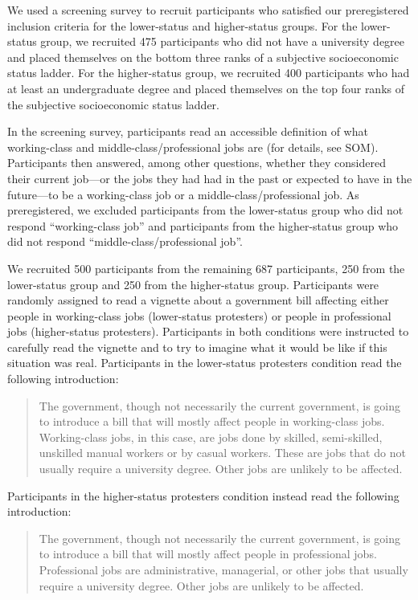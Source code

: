 \documentclass[12pt, letterpaper]{article}
\begin{document}
We used a screening survey to recruit participants who satisfied our
preregistered inclusion criteria for the lower-status and higher-status
groups. For the lower-status group, we recruited 475 participants who
did not have a university degree and placed themselves on the bottom
three ranks of a subjective socioeconomic status ladder. For the
higher-status group, we recruited 400 participants who had at least an
undergraduate degree and placed themselves on the top four ranks of the
subjective socioeconomic status ladder.

In the screening survey, participants read an accessible definition of
what working-class and middle-class/professional jobs are (for details,
see SOM). Participants then answered, among other questions, whether
they considered their current job---or the jobs they had had in the past
or expected to have in the future---to be a working-class job or a
middle-class/professional job. As preregistered, we excluded
participants from the lower-status group who did not respond
``working-class job'' and participants from the higher-status group who
did not respond ``middle-class/professional job''.

We recruited 500 participants from the remaining 687 participants, 250
from the lower-status group and 250 from the higher-status group.
Participants were randomly assigned to read a vignette about a
government bill affecting either people in working-class jobs
(lower-status protesters) or people in professional jobs (higher-status
protesters). Participants in both conditions were instructed to
carefully read the vignette and to try to imagine what it would be like
if this situation was real. Participants in the lower-status protesters
condition read the following introduction:

\begin{quote}
The government, though not necessarily the current government, is going
to introduce a bill that will mostly affect people in working-class
jobs. Working-class jobs, in this case, are jobs done by skilled,
semi-skilled, unskilled manual workers or by casual workers. These are
jobs that do not usually require a university degree. Other jobs are
unlikely to be affected.
\end{quote}

\noindent Participants in the higher-status protesters condition instead
read the following introduction:

\begin{quote}
The government, though not necessarily the current government, is going
to introduce a bill that will mostly affect people in professional jobs.
Professional jobs are administrative, managerial, or other jobs that
usually require a university degree. Other jobs are unlikely to be
affected.
\end{quote}
\end{document}
